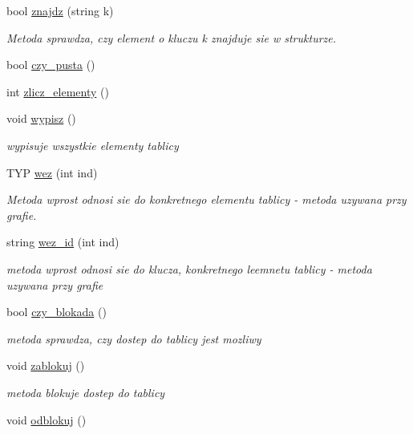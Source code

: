\begin{DoxyCompactItemize}
bool \hyperlink{classtablica__asocjacyjna_a800e2d6366198e365a0700197b2dced4}{znajdz} (string k)
\begin{DoxyCompactList}\small\item\em Metoda sprawdza, czy element o kluczu k znajduje sie w strukturze. \end{DoxyCompactList}\item 
bool \hyperlink{classtablica__asocjacyjna_a671f1d928a4d91c6e7708a55b1ce85dc}{czy\-\_\-pusta} ()
\item 
int \hyperlink{classtablica__asocjacyjna_a103aa115af24abf1d08c56e14c87b249}{zlicz\-\_\-elementy} ()
\item 
void \hyperlink{classtablica__asocjacyjna_a8ecdd39391d3dc84aea809c48b52c4d6}{wypisz} ()
\begin{DoxyCompactList}\small\item\em wypisuje wszystkie elementy tablicy \end{DoxyCompactList}\item 
T\-Y\-P \hyperlink{classtablica__asocjacyjna_a52a9625a6eaed5c952bdb28a62b98de9}{wez} (int ind)
\begin{DoxyCompactList}\small\item\em Metoda wprost odnosi sie do konkretnego elementu tablicy -\/ metoda uzywana przy grafie. \end{DoxyCompactList}\item 
string \hyperlink{classtablica__asocjacyjna_ae3dd4ef48ffaacb3d6e7985241e4fcdb}{wez\-\_\-id} (int ind)
\begin{DoxyCompactList}\small\item\em metoda wprost odnosi sie do klucza, konkretnego leemnetu tablicy -\/ metoda uzywana przy grafie \end{DoxyCompactList}\item 
bool \hyperlink{classtablica__asocjacyjna_affe02061bf41d4c433ca445cae152b25}{czy\-\_\-blokada} ()
\begin{DoxyCompactList}\small\item\em metoda sprawdza, czy dostep do tablicy jest mozliwy \end{DoxyCompactList}\item 
void \hyperlink{classtablica__asocjacyjna_a1a801bb889b41a3646553d20992897f8}{zablokuj} ()
\begin{DoxyCompactList}\small\item\em metoda blokuje dostep do tablicy \end{DoxyCompactList}\item 
void \hyperlink{classtablica__asocjacyjna_a6860d1e3736a0766540d21e64c8420ac}{odblokuj} ()

\end{DoxyCompactItemize}

